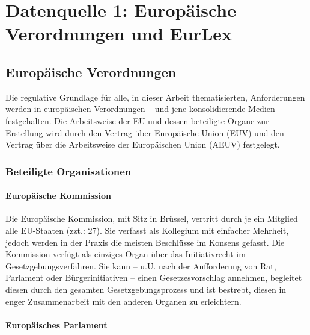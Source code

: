 \chapter{Datenquelle 1: Europäische Verordnungen und EurLex}




    \section{Europäische Verordnungen}


    Die regulative Grundlage für alle, in dieser Arbeit thematisierten, Anforderungen werden in europäischen Verordnungen -- und jene konsolidierende Medien -- festgehalten.
    Die Arbeitsweise der EU und dessen beteiligte Organe zur Erstellung  wird durch den Vertrag über Europäische Union (EUV) und den Vertrag über die Arbeitsweise der Europäischen Union (AEUV) festgelegt.
    
        
        
        \subsection{Beteiligte Organisationen}


\subsubsection{Europäische Kommission}

Die Europäische Kommission, mit Sitz in Brüssel, vertritt durch je ein Mitglied alle EU-Staaten (zzt.: 27). Sie verfasst als Kollegium mit einfacher Mehrheit, jedoch werden in der Praxis die meisten Beschlüsse im Konsens gefasst. 
Die Kommission verfügt als einziges Organ über das Initiativrecht im Gesetzgebungsverfahren. 
Sie kann – u.U. nach der Aufforderung von Rat, Parlament oder Bürgerinitiativen – einen Gesetzesvorschlag annehmen, begleitet diesen durch den gesamten Gesetzgebungsprozess und ist bestrebt, diesen in enger Zusammenarbeit mit den anderen Organen zu erleichtern.
\cite[Art. 17]{EUV}

\subsubsection{Europäisches Parlament}

